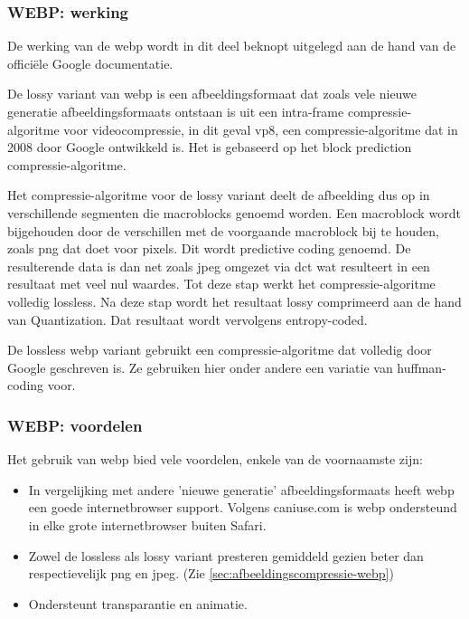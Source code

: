 \subsubsection{WEBP: werking}
\label{sec:afbeeldingscompressie-webp-werking}

De werking van de \gls{webp} wordt in dit deel beknopt uitgelegd aan de hand van de officiële Google documentatie. 

De \gls{lossy} variant van \gls{webp} is een \gls{afbeeldingsformaat} dat zoals vele nieuwe generatie \glspl{afbeeldingsformaat} ontstaan is uit een \gls{intra-frame} \gls{compressie-algoritme} voor \gls{videocompressie}, in dit geval \gls{vp8}, een \gls{compressie-algoritme} dat in 2008 door Google ontwikkeld is. Het is gebaseerd op het block prediction \gls{compressie-algoritme}.

Het \gls{compressie-algoritme} voor de \gls{lossy} variant deelt de afbeelding dus op in verschillende segmenten die macroblocks genoemd worden. Een macroblock wordt bijgehouden door de verschillen met de voorgaande macroblock bij te houden, zoals \gls{png} dat doet voor pixels. Dit wordt predictive coding genoemd. De resulterende data is dan net zoals \gls{jpeg} omgezet via \gls{dct} wat resulteert in een resultaat met veel nul waardes. Tot deze stap werkt het \gls{compressie-algoritme} volledig \gls{lossless}. Na deze stap wordt het resultaat \gls{lossy} comprimeerd aan de hand van Quantization. Dat resultaat wordt vervolgens entropy-coded.

De \gls{lossless} \gls{webp} variant gebruikt een \gls{compressie-algoritme} dat volledig door Google geschreven is. Ze gebruiken hier onder andere een variatie van \gls{huffman-coding} voor.

\subsubsection{WEBP: voordelen}
\label{sec:afbeeldingscompressie-webp-voordelen}

Het gebruik van \gls{webp} bied vele voordelen, enkele van de voornaamste zijn:

\begin{itemize}
	\item In vergelijking met andere 'nieuwe generatie' \glspl{afbeeldingsformaat} heeft \gls{webp} een goede internetbrowser support. Volgens caniuse.com is \gls{webp} ondersteund in elke grote internetbrowser buiten Safari.
	
	\item Zowel de \gls{lossless} als \gls{lossy} variant presteren gemiddeld gezien beter dan respectievelijk \gls{png} en \gls{jpeg}. (Zie \ref{sec:afbeeldingscompressie-webp})
	
	\item Ondersteunt transparantie en animatie.
\end{itemize}

